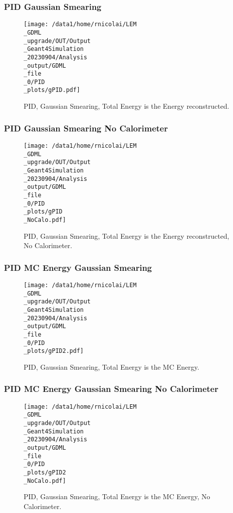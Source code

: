 \documentclass[8pt]{beamer}
\begin{document}
            \begin{frame}
                \frametitle{PID Gaussian Smearing}
            
        \begin{figure}[h]
            \centering
            \texttt{[image: /data1/home/rnicolai/LEM\\\_GDML\\\_upgrade/OUT/Output\\\_Geant4Simulation\\\_20230904/Analysis\\\_output/GDML\\\_file\\\_0/PID\\\_plots/gPID.pdf]}
            \caption{PID, Gaussian Smearing, Total Energy is the Energy reconstructed.}
        \end{figure}
        
            \end{frame}
            
            \begin{frame}
                \frametitle{PID Gaussian Smearing No Calorimeter}
            
        \begin{figure}[h]
            \centering
            \texttt{[image: /data1/home/rnicolai/LEM\\\_GDML\\\_upgrade/OUT/Output\\\_Geant4Simulation\\\_20230904/Analysis\\\_output/GDML\\\_file\\\_0/PID\\\_plots/gPID\\\_NoCalo.pdf]}
            \caption{PID, Gaussian Smearing, Total Energy is the Energy reconstructed, No Calorimeter.}
        \end{figure}
        
            \end{frame}
            
            \begin{frame}
                \frametitle{PID MC Energy Gaussian Smearing}
            
        \begin{figure}[h]
            \centering
            \texttt{[image: /data1/home/rnicolai/LEM\\\_GDML\\\_upgrade/OUT/Output\\\_Geant4Simulation\\\_20230904/Analysis\\\_output/GDML\\\_file\\\_0/PID\\\_plots/gPID2.pdf]}
            \caption{PID, Gaussian Smearing, Total Energy is the MC Energy.}
        \end{figure}
        
            \end{frame}
            
            \begin{frame}
                \frametitle{PID MC Energy Gaussian Smearing No Calorimeter}
            
        \begin{figure}[h]
            \centering
            \texttt{[image: /data1/home/rnicolai/LEM\\\_GDML\\\_upgrade/OUT/Output\\\_Geant4Simulation\\\_20230904/Analysis\\\_output/GDML\\\_file\\\_0/PID\\\_plots/gPID2\\\_NoCalo.pdf]}
            \caption{PID, Gaussian Smearing, Total Energy is the MC Energy, No Calorimeter.}
        \end{figure}
        
            \end{frame}
            
\end{document}
